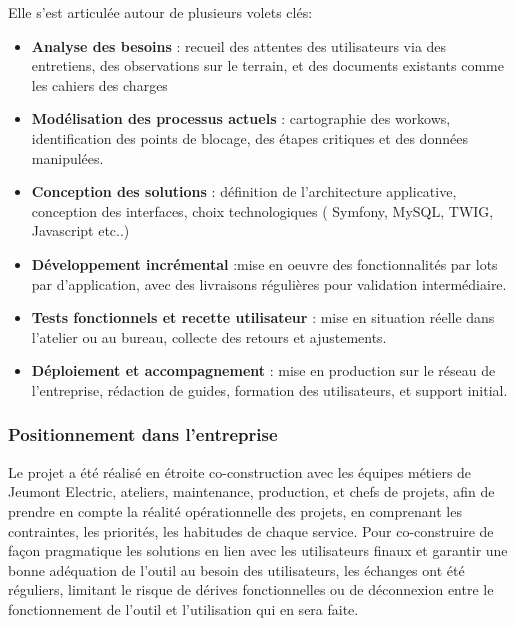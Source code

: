 \documentclass[11pt,a4paper]{article}
\begin{document}
Elle s'est articulée autour de plusieurs volets clés:


\begin{itemize}

    \item \textbf{Analyse des besoins} : recueil des attentes des utilisateurs via des entretiens, des observations sur le terrain, et des documents existants comme les cahiers des charges
    
    \item \textbf{Modélisation des processus actuels} : cartographie des workows, identification des points de blocage, des étapes critiques et des données manipulées.
       
    \item \textbf{Conception des solutions} : définition de l'architecture applicative, conception des interfaces, choix technologiques ( Symfony, MySQL, TWIG, Javascript etc..)
    
    \item \textbf{Développement incrémental} :mise en oeuvre des fonctionnalités par lots par d'application, avec des livraisons régulières pour validation intermédiaire.
    
    \item \textbf{Tests fonctionnels et recette utilisateur} : mise en situation réelle dans l'atelier ou au bureau, collecte des retours et ajustements.
    
    \item \textbf{Déploiement et accompagnement} : mise en production sur le réseau de l’entreprise, rédaction de guides, formation des utilisateurs, et support initial.
\end{itemize}

\subsubsection{Positionnement dans l’entreprise}

Le projet a été réalisé en étroite co-construction avec les équipes métiers de Jeumont Electric, ateliers, maintenance, production, et chefs de projets, afin de prendre en compte la réalité opérationnelle des projets, en comprenant les contraintes, les priorités, les habitudes de chaque service. Pour co-construire de façon pragmatique les solutions en lien avec les utilisateurs finaux et garantir une bonne adéquation de l’outil au besoin des utilisateurs, les échanges ont été réguliers, limitant le risque de dérives fonctionnelles ou de déconnexion entre le fonctionnement de l’outil et l’utilisation qui en sera faite.
\end{document}
